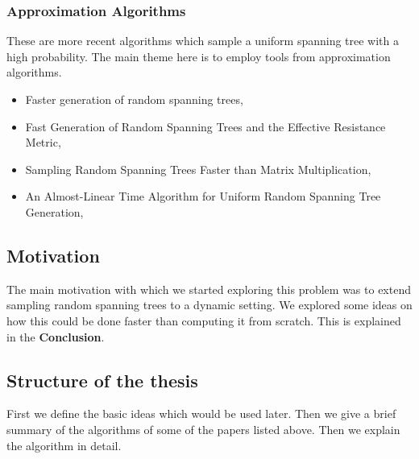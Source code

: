 \subsubsection{Approximation Algorithms}
These are more recent algorithms which sample a uniform spanning tree with a high probability. The main theme here is to employ tools from approximation algorithms. 
\begin{itemize}
\item Faster generation of random spanning trees, \cite{10.5555/1747597.1748019}
\item Fast Generation of Random Spanning Trees and the Effective Resistance Metric, \cite{10.5555/2722129.2722263}
\item Sampling Random Spanning Trees Faster than Matrix Multiplication, \cite{10.1145/3055399.3055499}
\item An Almost-Linear Time Algorithm for Uniform Random Spanning Tree Generation, \cite{10.1145/3188745.3188852}
\end{itemize}

\subsection{Motivation}

The main motivation with which we started exploring this problem was to extend sampling random spanning trees to a dynamic setting. We explored some ideas on how this could be done faster than computing it from scratch. This is explained in the \textbf{Conclusion}.

\subsection{Structure of the thesis}

First we define the basic ideas which would be used later. Then we give a brief summary of the algorithms of some of the papers listed above. Then we explain the \citet{harvey2016generating} algorithm in detail.



